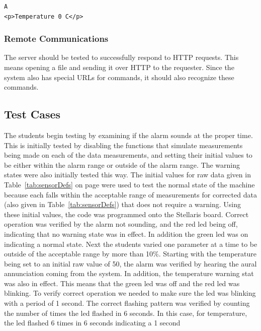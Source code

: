 \documentclass[12pt]{article} %
\begin{document}
\begin{lstlisting}[caption=Command Response, captionpos=b, label=lst:comm]
A
<p>Temperature 0 C</p>
\end{lstlisting}

    \subsubsection{Remote Communications}  The server should be tested to
    successfully respond to HTTP requests.  This means opening a file and sending
    it over HTTP to the requester.  Since the system also has special URLs for 
    commands, it should also recognize these commands.


    \subsection{Test Cases} The students begin testing by examining if the
    alarm sounds at the proper time.  This is initially tested by disabling the
    functions that simulate measurements being made on each of the data
    measurements, and setting their initial values to be either within the
    alarm range or outside of the alarm range. The warning states were also
    initially tested this way. The initial values for raw data given in
    Table~\ref{tab:sensorDefs} on page \pageref{tab:sensorDefs} were used to
    test the normal state of the machine because each falls within the
    acceptable range of measurements for corrected data (also given in
    Table~\ref{tab:sensorDefs}) that does not require a warning.  Using these
    initial values, the code was programmed onto the Stellaris board.  Correct
    operation was verified by the alarm not sounding, and the red led being
    off, indicating that no warning state was in effect. In addition the green
    led was on indicating a normal state. Next the students varied one
    parameter at a time to be outside of the acceptable range by more than
    10\%. Starting with the temperature being set to an initial raw value of
    50, the alarm was verified by hearing the aural annunciation coming from
    the system. In addition, the temperature warning stat was also in effect.
    This means that the green led was off and the red led was blinking. To
    verify correct operation we needed to make sure the led was blinking with a
    period of 1 second. The correct flashing pattern was verified by counting
    the number of times the led flashed in 6 seconds.  In this case, for
    temperature, the led flashed 6 times in 6 seconds indicating a 1 second
\end{document}
